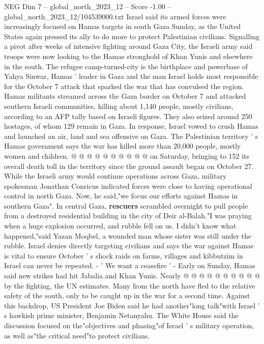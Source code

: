 \begin{textsample}{NEG Dim 7 – global\_north\_2023\_12 – Score -1.00 – global\_north\_2023\_12/104539000.txt}  \label{ex:f7_neg_303}
Israel said its armed forces were increasingly focused on Hamas targets in south Gaza Sunday, as the United States again pressed its ally to do more to protect Palestinian civilians.
Signalling a pivot after weeks of intensive fighting around Gaza City, the Israeli army said troops were now looking to the Hamas stronghold of Khan Yunis and elsewhere in the south.
The refugee camp-turned-city is the birthplace and powerbase of Yahya Sinwar, Hamas ' leader in Gaza and the man Israel holds most responsible for the October 7 attack that sparked the war that has convulsed the region.
Hamas militants streamed across the Gaza border on October 7 and attacked southern Israeli communities, killing about 1,140 people, mostly civilians, according to an AFP tally based on Israeli figures.
They also seized around 250 hostages, of whom 129 remain in Gaza.
In response, Israel vowed to crush Hamas and launched an air, land and sea offensive on Gaza.
The Palestinian territory ' s Hamas government says the war has killed more than 20,000 people, mostly women and children. @ @ @ @ @ @ @ @ @ @ on Saturday, bringing to 152 its overall death toll in the territory since the ground assault began on October 27.
While the Israeli army would continue operations across Gaza, military spokesman Jonathan Conricus indicated forces were close to having operational control in north Gaza.
Now, he said,"we focus our efforts against Hamas in southern Gaza".
In central Gaza, \textbf{rescuers} scrambled overnight to pull people from a destroyed residential building in the city of Deir al-Balah."I was praying when a huge explosion occurred, and rubble fell on us.
I didn't know what happened,"said Yazan Moqbel, a wounded man whose sister was still under the rubble.
Israel denies directly targeting civilians and says the war against Hamas is vital to ensure October ' s shock raids on farms, villages and kibbutzim in Israel can never be repeated. - ' We want a ceasefire ' - Early on Sunday, Hamas said new strikes had hit Jabalia and Khan Yunis.
Nearly @ @ @ @ @ @ @ @ @ @ by the fighting, the UN estimates.
Many from the north have fled to the relative safety of the south, only to be caught up in the war for a second time.
Against this backdrop, US President Joe Biden said he had another"long talk"with Israel ' s hawkish prime minister, Benjamin Netanyahu.
The White House said the discussion focused on the"objectives and phasing"of Israel ' s military operation, as well as"the critical need"to protect civilians.

\end{textsample}
